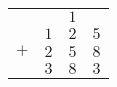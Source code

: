 \documentclass{standalone}
\begin{document}
\begin{tabular}{cccc}
	& & {\small \(1\)} & \\
	& \(1\) & \(2\) & \(5\) \\
	\(+\) &\(2\) & \(5\) & \(8\) \\ \hline
	& \(3\) & \(8\) & \(3\)
\end{tabular} 
\end{document}
